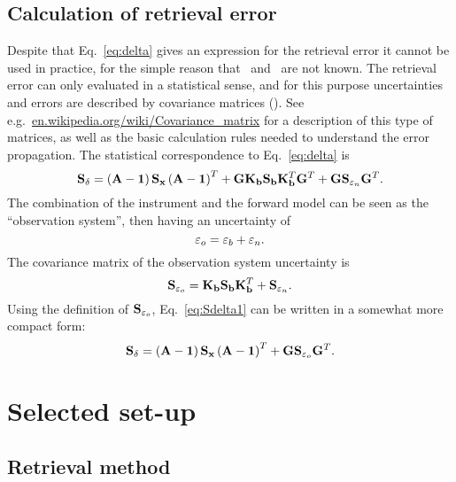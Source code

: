 \subsection{Calculation of retrieval error}
%
Despite that Eq.~\ref{eq:delta} gives an expression for the retrieval error it cannot be used in practice, for the simple reason that \SttVct\ and \FrwMdlVct\
are not known. The retrieval error can only evaluated in a statistical sense,
and for this purpose uncertainties and errors are described by
covariance matrices (\CvrMtr). See e.g.\
\url{en.wikipedia.org/wiki/Covariance_matrix} for a description of this type of
matrices, as well as the basic calculation rules needed to understand the error
propagation. The statistical correspondence to Eq.~\ref{eq:delta} is
\begin{equation}
  \label{eq:Sdelta1}
  \mathbf{S}_{\delta} = \left(\mathbf{A}-\mathbf{1}\right)\mathbf{S}_{\mathbf{x}}
  \left(\mathbf{A}-\mathbf{1}\right)^T + 
  \mathbf{G}\mathbf{K}_{\mathbf{b}}\mathbf{S}_{\mathbf{b}}
  \mathbf{K}_{\mathbf{b}}^T\mathbf{G}^T + 
  \mathbf{G}\mathbf{S}_{\varepsilon_n}\mathbf{G}^T.
\end{equation}
The combination of the instrument and the forward model can be seen as
the ``observation system'', then having an uncertainty of
\begin{equation}
  \label{eq:eps_o}
  \varepsilon_o = \varepsilon_b + \varepsilon_n. 
\end{equation}
The covariance matrix of the observation system uncertainty is 
\begin{equation}
  \label{eq:So}
  \mathbf{S}_{\varepsilon_o} = \mathbf{K}_{\mathbf{b}}\mathbf{S}_{\mathbf{b}}
  \mathbf{K}_{\mathbf{b}}^T + \mathbf{S}_{\varepsilon_n}.
\end{equation}
Using the definition of $\mathbf{S}_{\varepsilon_o}$, Eq.~\ref{eq:Sdelta1}
can be written in a somewhat more compact form:
\begin{equation}
  \label{eq:Sdelta2}
  \mathbf{S}_{\delta} = \left(\mathbf{A}-\mathbf{1}\right)\mathbf{S}_{\mathbf{x}}
  \left(\mathbf{A}-\mathbf{1}\right)^T + \mathbf{G}\mathbf{S}_{\varepsilon_o}\mathbf{G}^T.
\end{equation}



\section{Selected set-up}
\label{sec:setup}

\subsection{Retrieval method}
\label{sec:setup:inverse}
%

